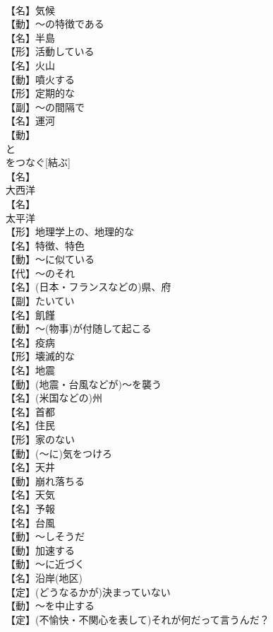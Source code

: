 \documentclass[8pt]{extreport}
\begin{document}
\begin{CJK}{UTF8}{min}
\\	【名】気候
\\	【動】～の特徴である
\\	【名】半島
\\	【形】活動している
\\	【名】火山
\\	【動】噴火する
\\	【形】定期的な
\\	【副】～の間隔で
\\	【名】運河
\\	【動】
\\	と
\\	をつなぐ[結ぶ]
\\	【名】
\\	大西洋
\\	【名】
\\	太平洋
\\	【形】地理学上の、地理的な
\\	【名】特徴、特色
\\	【動】～に似ている
\\	【代】～のそれ
\\	【名】(日本・フランスなどの)県、府
\\	【副】たいてい
\\	【名】飢饉
\\	【動】～(物事)が付随して起こる
\\	【名】疫病
\\	【形】壊滅的な
\\	【名】地震
\\	【動】(地震・台風などが)～を襲う
\\	【名】(米国などの)州
\\	【名】首都
\\	【名】住民
\\	【形】家のない
\\	【動】(～に)気をつけろ
\\	【名】天井
\\	【動】崩れ落ちる
\\	【名】天気
\\	【名】予報
\\	【名】台風
\\	【動】～しそうだ
\\	【動】加速する
\\	【動】～に近づく
\\	【名】沿岸(地区)
\\	【定】(どうなるかが)決まっていない
\\	【動】～を中止する
\\	【定】(不愉快・不関心を表して)それが何だって言うんだ？

\end{CJK}
\end{document}
